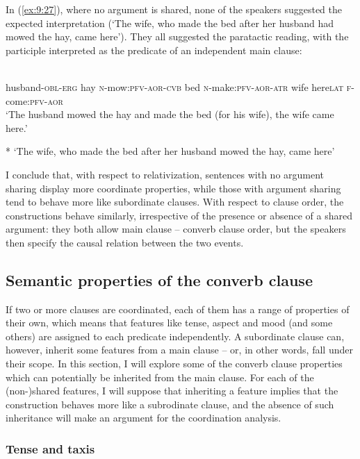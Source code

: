 ﻿\documentclass[output=paper]{langsci/langscibook}
\begin{document}
In (\ref{ex:9:27}), where no argument is shared, none of the speakers
suggested the expected interpretation (`The wife, who made the bed after her
husband had mowed the hay, came here'). They all suggested the paratactic reading, with  
the participle interpreted as the predicate of an independent main clause:

\ea \label{ex:9:27} %
\\
husband-\textsc{obl}-\textsc{erg} hay \textsc{n}-mow:\textsc{pfv}-\textsc{aor}-\textsc{cvb} bed \textsc{n}-make:\textsc{pfv}-\textsc{aor}-\textsc{atr} wife here\textsc{lat} \textsc{f}-come:\textsc{pfv}-\textsc{aor}\\
\glt `The husband mowed the hay and made the bed (for his wife), the wife came
here.'

* `The wife, who made the bed after her husband mowed the hay, came here'
\z

I conclude that, with respect to relativization, sentences with no
argument sharing display more coordinate properties, while those with
argument sharing tend to behave more like subordinate clauses. With respect to clause
order, the constructions behave similarly, irrespective of the presence or
absence of a shared argument: they both allow main clause -- converb
clause order, but the speakers then specify the causal relation between
the two events.
%

\subsection{Semantic properties of the converb clause}

If two or more clauses are coordinated, each of them has a range of
properties of their own, which means that features like tense, aspect
and mood (and some others) are assigned to each predicate independently.
A subordinate clause can, however, inherit some features from a main
clause – or, in other words, fall under their scope. In this section,
I will explore some of the converb clause properties which can
potentially be inherited from the main clause. For each of the
(non-)shared features, I will suppose that inheriting a 
feature implies that the construction behaves more like a subrodinate clause,
and the absence of such inheritance will make an argument for the
coordination analysis.

\subsubsection{Tense and taxis}
\end{document}
